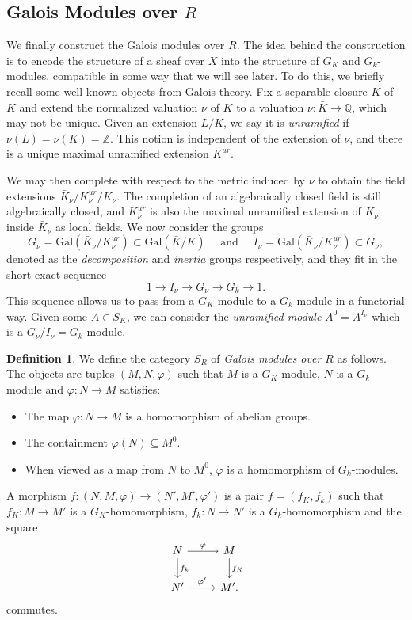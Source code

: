 \documentclass{article}
\newcommand{\Gal}{\mathrm{Gal}}
\newcommand{\Q}{\mathbb{Q}}
\newcommand{\Z}{\mathbb{Z}}
\theoremstyle{plain}
\theoremstyle{definition}
\newtheorem{definition}[theorem]{Definition}
\begin{document}
    \subsection{Galois Modules over \texorpdfstring{$R$}{TEXT}}
    We finally construct the Galois modules over $R$. The idea behind the construction is to encode the structure of a sheaf over $X$ into the structure of $G_K$ and $G_k$-modules, compatible in some way that we will see later. To do this, we briefly recall some well-known objects from Galois theory. Fix a separable closure $\bar K$ of $K$ and extend the normalized valuation $\nu$ of $K$ to a valuation $\nu:\bar K\to\Q$, which may not be unique. Given an extension $L/K$, we say it is \textit{unramified} if $\nu(L)=\nu(K)=\Z$. This notion is independent of the extension of $\nu$, and there is a unique maximal unramified extension $K^{ur}$.

    We may then complete with respect to the metric induced by $\nu$ to obtain the field extensions $\bar K_\nu/K^{ur}_\nu/K_\nu$. The completion of an algebraically closed field is still algebraically closed, and $K^{ur}_\nu$ is also the maximal unramified extension of $K_\nu$ inside $\bar K_\nu$ as local fields. We now consider the groups
    $$G_\nu=\Gal(\bar K_\nu/K^{ur}_\nu)\subset\Gal(\bar K/K)\quad\text{ and }\quad I_\nu=\Gal(\bar K_\nu/K^{ur}_\nu)\subset G_\nu,$$
    denoted as the \textit{decomposition} and \textit{inertia} groups respectively, and they fit in the short exact sequence
    $$1\longrightarrow I_\nu\longrightarrow G_\nu\longrightarrow G_k\longrightarrow 1.$$
    This sequence allows us to pass from a $G_K$-module to a $G_k$-module in a functorial way. Given some $A\in S_K$, we can consider the \textit{unramified module} $A^0=A^{I_\nu}$ which is a $G_\nu/I_\nu=G_k$-module.

    \begin{definition}\label{defn:galoismod}
        We define the category $S_R$ of \textit{Galois modules over $R$} as follows. The objects are tuples $(M,N,\varphi)$ such that $M$ is a $G_K$-module, $N$ is a $G_k$-module and $\varphi:N\to M$ satisfies: 
        \begin{itemize}
            \item The map $\varphi:N\to M$ is a homomorphism of abelian groups.
            \item The containment $\varphi(N)\subseteq M^0$.
            \item When viewed as a map from $N$ to $M^{0}$, $\varphi$ is a homomorphism of $G_k$-modules.
        \end{itemize}
        A morphism $f:(N,M,\varphi)\to(N',M',\varphi')$ is a pair $f=(f_K,f_k)$ such that $f_K:M\to M'$ is a $G_K$-homomorphism, $f_k:N\to N'$ is a $G_k$-homomorphism and the square
        \[
            \begin{tikzcd}
                N \arrow[r,"\varphi"] \arrow[d,"f_k"] & M \arrow[d,"f_K"] \\
                N' \arrow[r,"\varphi'"] & M'.
            \end{tikzcd}
        \]
        commutes.
    \end{definition}
\end{document}
